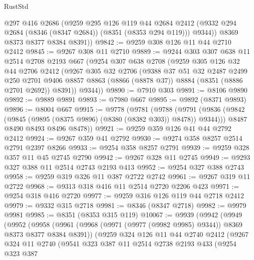 \begin{lexlean}{RustStd}
\begin{coremodule}
          @297
          @416
          @2686
          (@9259
            @295
            @126
            @119
            @44
            @2684
            @2412
            (@9332 @294 @2684 (@8346 (@8347 @2684)) (@8351 (@8353 @294 @119)))
            @9344))
        @8369
        @8373
        @8377
        @8384
        @8391))
@9842 := @9259 @308 @126 @11 @44 @2710 @2412
@9845 := @9267 @308 @11 @2710
@9889 := @9244
    @303
    @307
    @638
    @11
    @2514
    @2708
    @2193
    @667
    (@9254
      @307
      @638
      @2708
      (@9259
        @305
        @126
        @32
        @44
        @2706
        @2412
        (@9267
          @305
          @32
          @2706
          (@9388
            @37
            @51
            @32
            @2487
            @2499
            @250
            @2701
            @9406
            @8857
            @8863
            (@8866 (@8878 @37))
            @8884
            (@8351 (@8886 @2701 @2692))
            @8391))
        @9344))
@9890 := @7910 @303
@9891 := @8106 @9890
@9892 := @9889 @9891
@9893 := @7980 @667
@9895 := @9892 (@8371 @9893)
@9896 := @8004 @667
@9915 := @9778
    (@9781
      (@9788
        (@9791 (@9836 (@9842 (@9845 (@9895 (@8375 @9896) (@8380 (@8382 @303)) @8478)) @9344)))
        @8487
        @8490
        @8493
        @8496
        @8478))
@9921 := @9259 @359 @126 @41 @44 @2792 @2412
@9924 := @9267 @359 @41 @2792
@9930 := @9274 @358 @8257 @2514 @2791 @2397 @8266
@9933 := @9254 @358 @8257 @2791
@9939 := @9259 @328 @357 @11 @45 @2745 @2790
@9942 := @9267 @328 @11 @2745
@9949 := @9293 @327 @388 @11 @2514 @2743 @2193 @413
@9952 := @9254 @327 @388 @2743
@9958 := @9259 @319 @326 @11 @387 @2722 @2742
@9961 := @9267 @319 @11 @2722
@9968 := @9313 @318 @416 @11 @2514 @2720 @2206 @423
@9971 := @9254 @318 @416 @2720
@9977 := @9259 @316 @126 @119 @44 @2718 @2412
@9979 := @9332 @315 @2718
@9981 := @8346 (@8347 @2718)
@9982 := @9979 @9981
@9985 := @8351 (@8353 @315 @119)
@10067 := @9939
    (@9942
      (@9949
        (@9952
          (@9958
            (@9961 (@9968 (@9971 (@9977 (@9982 @9985) @9344)) @8369 @8373 @8377 @8384 @8391))
            (@9259
              @324
              @126
              @11
              @44
              @2740
              @2412
              (@9267
                @324
                @11
                @2740
                (@9541
                  @323
                  @387
                  @11
                  @2514
                  @2738
                  @2193
                  @433
                  (@9254
                    @323
                    @387

\end{coremodule}
\end{lexlean}
